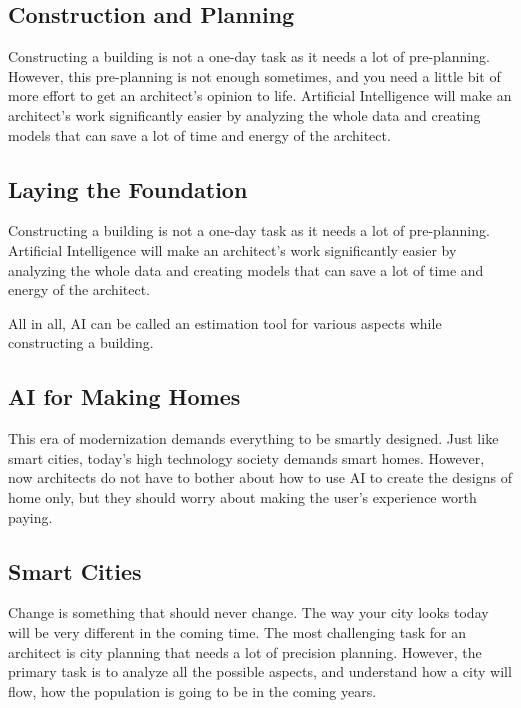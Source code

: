 \documentclass[10pt,a4paper,twoside]{article}
\begin{document}
\subsection{  Construction and Planning }

Constructing a building is not a one-day task as it needs a lot of pre-planning. However, this pre-planning is not enough sometimes, and you need a little bit of more effort to get an architect’s opinion to life. Artificial Intelligence will make an architect’s work significantly easier by analyzing the whole data and creating models that can save a lot of time and energy of the architect.

\subsection{ Laying the Foundation }

Constructing a building is not a one-day task as it needs a lot of pre-planning. Artificial Intelligence will make an architect’s work significantly easier by analyzing the whole data and creating models that can save a lot of time and energy of the architect.

All in all, AI can be called an estimation tool for various aspects while constructing a building.
\subsection{  AI for Making Homes }
This era of modernization demands everything to be smartly designed. Just like smart cities, today’s high technology society demands smart homes. However, now architects do not have to bother about how to use AI to create the designs of home only, but they should worry about making the user’s experience worth paying.
\subsection{   Smart Cities }
Change is something that should never change. The way your city looks today will be very different in the coming time. The most challenging task for an architect is city planning that needs a lot of precision planning. However, the primary task is to analyze all the possible aspects, and understand how a city will flow, how the population is going to be in the coming years.
 
\end{document}
